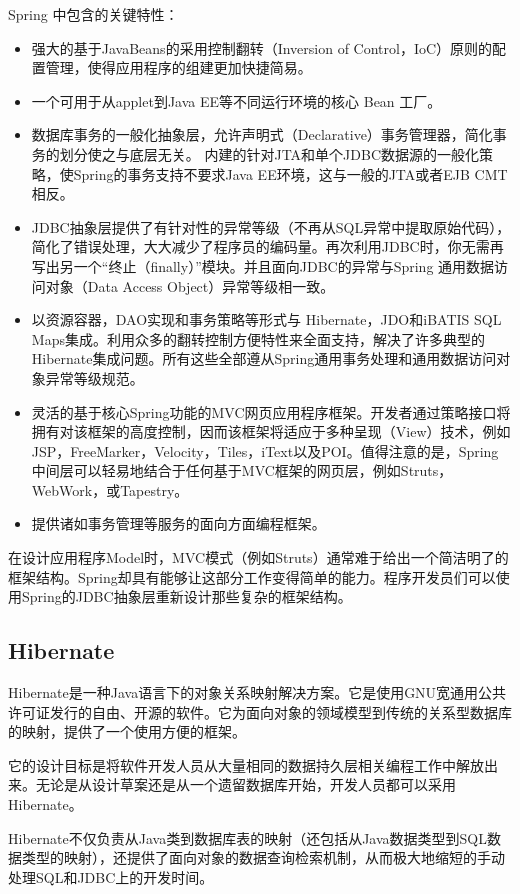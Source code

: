 Spring 中包含的关键特性：
\begin{itemize}
	\item 强大的基于JavaBeans的采用控制翻转（Inversion of Control，IoC）原则的配置管理，使得应用程序的组建更加快捷简易。
	\item 一个可用于从applet到Java EE等不同运行环境的核心 Bean 工厂。
	\item 数据库事务的一般化抽象层，允许声明式（Declarative）事务管理器，简化事务的划分使之与底层无关。
内建的针对JTA和单个JDBC数据源的一般化策略，使Spring的事务支持不要求Java EE环境，这与一般的JTA或者EJB CMT相反。
	\item JDBC抽象层提供了有针对性的异常等级（不再从SQL异常中提取原始代码），简化了错误处理，大大减少了程序员的编码量。再次利用JDBC时，你无需再写出另一个``终止（finally）''模块。并且面向JDBC的异常与Spring 通用数据访问对象（Data Access Object）异常等级相一致。
	\item 以资源容器，DAO实现和事务策略等形式与 Hibernate，JDO和iBATIS SQL Maps集成。利用众多的翻转控制方便特性来全面支持，解决了许多典型的Hibernate集成问题。所有这些全部遵从Spring通用事务处理和通用数据访问对象异常等级规范。
	\item 灵活的基于核心Spring功能的MVC网页应用程序框架。开发者通过策略接口将拥有对该框架的高度控制，因而该框架将适应于多种呈现（View）技术，例如JSP，FreeMarker，Velocity，Tiles，iText以及POI。值得注意的是，Spring 中间层可以轻易地结合于任何基于MVC框架的网页层，例如Struts，WebWork，或Tapestry。
	\item 提供诸如事务管理等服务的面向方面编程框架。
\end{itemize}

在设计应用程序Model时，MVC模式（例如Struts）通常难于给出一个简洁明了的框架结构。Spring却具有能够让这部分工作变得简单的能力。程序开发员们可以使用Spring的JDBC抽象层重新设计那些复杂的框架结构。

\subsection{Hibernate}
Hibernate是一种Java语言下的对象关系映射解决方案。它是使用GNU宽通用公共许可证发行的自由、开源的软件。它为面向对象的领域模型到传统的关系型数据库的映射，提供了一个使用方便的框架。

它的设计目标是将软件开发人员从大量相同的数据持久层相关编程工作中解放出来。无论是从设计草案还是从一个遗留数据库开始，开发人员都可以采用Hibernate。

Hibernate不仅负责从Java类到数据库表的映射（还包括从Java数据类型到SQL数据类型的映射），还提供了面向对象的数据查询检索机制，从而极大地缩短的手动处理SQL和JDBC上的开发时间。

